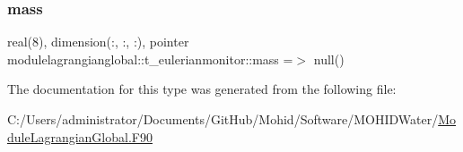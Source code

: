 \subsubsection{\texorpdfstring{mass}{mass}}
{\footnotesize\ttfamily real(8), dimension(\+:, \+:, \+:), pointer modulelagrangianglobal\+::t\+\_\+eulerianmonitor\+::mass =$>$ null()\hspace{0.3cm}{\ttfamily [private]}}



The documentation for this type was generated from the following file\+:\begin{DoxyCompactItemize}
\item 
C\+:/\+Users/administrator/\+Documents/\+Git\+Hub/\+Mohid/\+Software/\+M\+O\+H\+I\+D\+Water/\mbox{\hyperlink{_module_lagrangian_global_8_f90}{Module\+Lagrangian\+Global.\+F90}}\end{DoxyCompactItemize}
